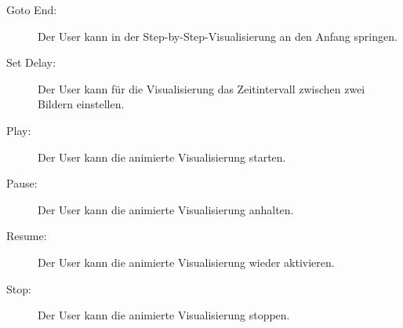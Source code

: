\begin{description}
  \item[Goto End:] Der User kann in der Step-by-Step-Visualisierung an den Anfang springen.

  \item[Set Delay:] Der User kann f\"ur die Visualisierung das Zeitintervall zwischen zwei Bildern einstellen.

  \item[Play:] Der User kann die animierte Visualisierung starten.

  \item[Pause:] Der User kann die animierte Visualisierung anhalten.

  \item[Resume:] Der User kann die animierte Visualisierung wieder aktivieren.

  \item[Stop:] Der User kann die animierte Visualisierung stoppen.
\end{description}
% 
